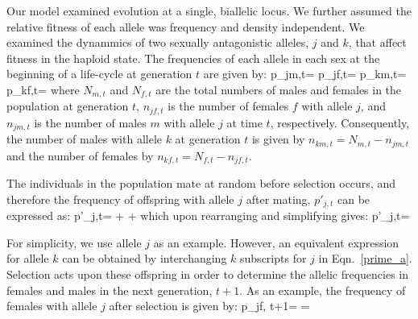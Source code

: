 \documentclass[12pt]{article}
\let\oldequation\equation
\let\oldendequation\endequation
\renewenvironment{equation}
  {\linenomathNonumbers\oldequation}
  {\oldendequation\endlinenomath}
\begin{document}
Our model examined evolution at a single, biallelic locus. We further assumed the relative fitness of each allele was frequency and density independent. We examined the dynammics of two  sexually antagonistic alleles, $j$ and $k$, that affect fitness in the haploid state. The frequencies of each allele in each sex at the beginning of a life-cycle at generation $t$ are given by:
\begin{equation}
    p_{jm,t}= 
    \label{first_pop}
\end{equation}
\begin{equation}
    p_{jf,t}= 
\end{equation}
\begin{equation}
    p_{km,t}=  
\end{equation}
\begin{equation}
    p_{kf,t}= 
\end{equation}
where $N_{m,t}$ and $N_{f,t}$ are the total numbers of males and females in the population at generation $t$, $n_{jf,t}$ is the number of females $f$ with allele $j$, and $n_{jm,t}$ is the number of males $m$ with allele $j$ at time $t$, respectively. Consequently, the number of males with allele $k$ at generation $t$ is given by $n_{km,t}=N_{m,t}-n_{jm,t}$ and the number of females by $n_{kf,t}=N_{f,t}-n_{jf,t}$.

The individuals in the population mate at random before selection occurs, and therefore the frequency of offspring with allele $j$ after mating, $p'_{j,t}$ can be expressed as:
\begin{equation}
   p'_{j,t}=   +    +
    
   \label{prime_a}
\end{equation}
which upon rearranging and simplifying gives:
\begin{equation}
   p'_{j,t}= 
   \label{pprime}
\end{equation}

For simplicity, we use allele $j$ as an example. However, an equivalent expression for allele $k$ can be obtained by interchanging $k$ subscripts for $j$ in Eqn.~\ref{prime_a}. Selection acts upon these offspring in order to determine the allelic frequencies in females and males in the next generation, $t+1$. As an example, the frequency  of females with allele $j$ after selection is given by:
\begin{equation}
   p_{jf, t+1}=  = 
   \label{next_gen}
\end{equation}
\end{document}
